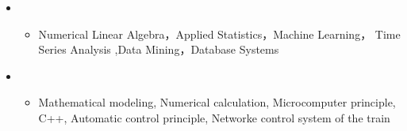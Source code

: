   \begin{itemize}[leftmargin=*]

  
      \item
      {\small
      \begin{itemize}
        \item{Numerical Linear Algebra，Applied Statistics，Machine Learning， Time Series Analysis ,Data Mining，Database Systems}
      \end{itemize}
      }
      
        \item
      {\small
      \begin{itemize}
        \item{Mathematical modeling, Numerical calculation, Microcomputer principle, C++, Automatic control principle, Networke control system of the train}
      \end{itemize}
      }
      
  \end{itemize} 